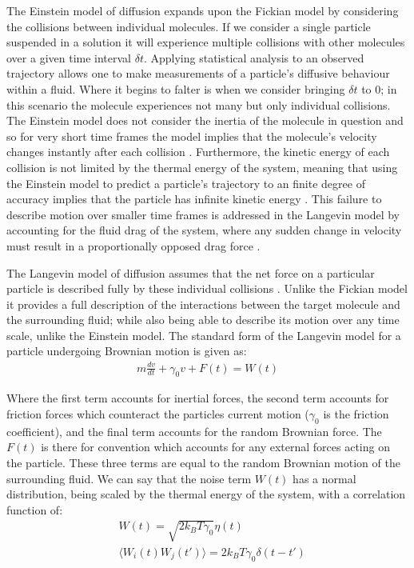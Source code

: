The Einstein model of diffusion expands upon the Fickian model 
by considering the collisions between individual molecules. If 
we consider a single particle suspended in a solution it will 
experience multiple collisions with other molecules 
\cite{Gillespie2012a} over a given time interval $\delta t$. 
Applying statistical analysis to an observed trajectory allows
one to make measurements of a particle's diffusive behaviour 
within a fluid. Where it begins to falter is when we consider 
bringing $\delta t$ to $0$; in this scenario the molecule 
experiences not many but only individual collisions. The 
Einstein model does not consider the inertia of the molecule 
in question and so for very short time frames the model 
implies that the molecule's velocity changes instantly after 
each collision \cite{Gillespie2012a, Gillespie2012b}. 
Furthermore, the kinetic energy of each collision is not 
limited by the thermal energy of the system, meaning that 
using the Einstein model to predict a particle's trajectory 
to an finite degree of accuracy implies that the particle 
has infinite kinetic energy \cite{Gillespie2012b}. This 
failure to describe motion over smaller time frames is 
addressed in the Langevin model by accounting for the fluid 
drag of the system, where any sudden change in velocity must 
result in a proportionally opposed drag force \cite{Gillespie2012c}. 

The Langevin model of diffusion assumes that the net force on 
a particular particle is described fully by these individual 
collisions \cite{Gillespie2012c}. Unlike the Fickian model it 
provides a full description of the interactions between the 
target molecule and the surrounding fluid; while also being 
able to describe its motion over any time scale, unlike the 
Einstein model. The standard form of the Langevin model for 
a particle undergoing Brownian motion is given as:
\begin{align}
	m\frac{dv}{dt} + \gamma_0 v + F(t) = W(t)
\end{align}

Where the first term accounts for inertial forces, the second 
term accounts for friction forces which counteract the particles 
current motion ($\gamma_0$ is the friction coefficient), and 
the final term accounts for the random Brownian force. The 
$F(t)$ is there for convention which accounts for any external 
forces acting on the particle. These three terms are equal to 
the random Brownian motion of the surrounding fluid. We can 
say that the noise term $W(t)$ has a normal distribution, 
being scaled by the thermal energy of the system, with a 
correlation function of:
\begin{align}
	&W(t) = \sqrt{2k_BT\gamma_0}\eta(t) \\
	&\langle W_i(t)W_j(t')\rangle = 2k_BT\gamma_0\delta(t-t')
\end{align}

